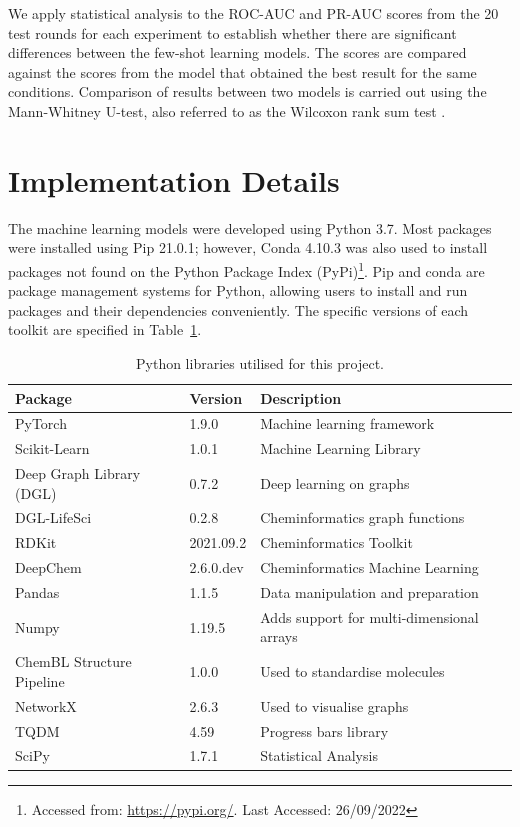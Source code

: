 We apply statistical analysis to the ROC-AUC and PR-AUC scores from the 20 test rounds for each experiment to establish whether there are significant differences between the few-shot learning models. The scores are compared against the scores from the model that obtained the best result for the same conditions. Comparison of results between two models is carried out using the Mann-Whitney U-test, also referred to as the Wilcoxon rank sum test \citep{mann1947test}.

\section{Implementation Details}

The machine learning models were developed using Python 3.7. Most packages were installed using Pip 21.0.1; however, Conda 4.10.3 was also used to install packages not found on the Python Package Index (PyPi)\footnote{Accessed from: \url{https://pypi.org/}. Last Accessed: 26/09/2022}. Pip and conda are package management systems for Python, allowing users to install and run packages and their dependencies conveniently. The specific versions of each toolkit are specified in Table~\ref{tab:versions}.

\begin{table}
    \centering
    \begin{tabular}{@{}lll@{}}
        \hline
        \textbf{Package} & \textbf{Version} & \textbf{Description} \\
        \hline
        PyTorch & 1.9.0 & Machine learning framework \\
        Scikit-Learn & 1.0.1 & Machine Learning Library \\
        Deep Graph Library (DGL) & 0.7.2 & Deep learning on graphs \\
        DGL-LifeSci & 0.2.8 & Cheminformatics graph functions \\
        RDKit & 2021.09.2 & Cheminformatics Toolkit \\
        DeepChem & 2.6.0.dev & Cheminformatics Machine Learning \\
        Pandas & 1.1.5 & Data manipulation and preparation \\
        Numpy & 1.19.5 & Adds support for multi-dimensional arrays \\
        ChemBL Structure Pipeline & 1.0.0 & Used to standardise molecules \\
        NetworkX & 2.6.3 & Used to visualise graphs \\
        TQDM & 4.59 & Progress bars library \\
        SciPy & 1.7.1 & Statistical Analysis \\
        \hline
    \end{tabular}
    \caption{Python libraries utilised for this project.}
    \label{tab:versions}
\end{table}

